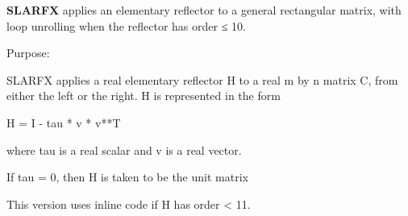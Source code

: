 {\bfseries S\+L\+A\+R\+F\+X} applies an elementary reflector to a general rectangular matrix, with loop unrolling when the reflector has order ≤ 10. 

 \begin{DoxyParagraph}{Purpose\+: }
\begin{DoxyVerb} SLARFX applies a real elementary reflector H to a real m by n
 matrix C, from either the left or the right. H is represented in the
 form

       H = I - tau * v * v**T

 where tau is a real scalar and v is a real vector.

 If tau = 0, then H is taken to be the unit matrix

 This version uses inline code if H has order < 11.\end{DoxyVerb}
 
\end{DoxyParagraph}

